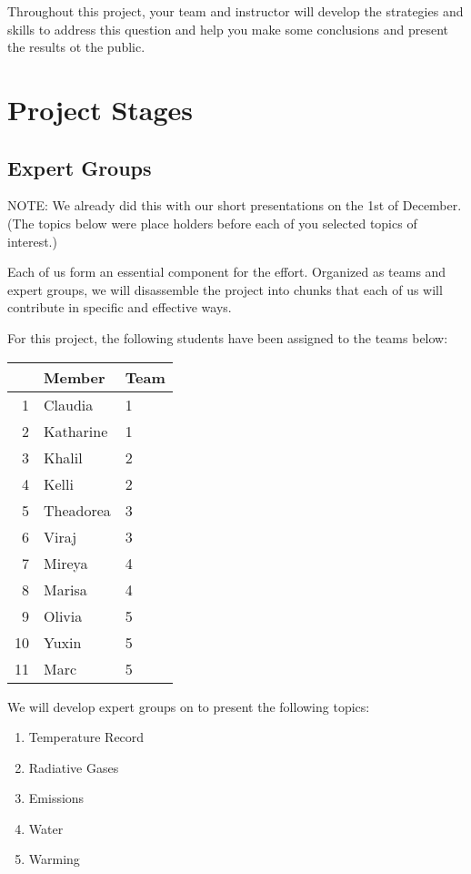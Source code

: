 \documentclass{article}\usepackage[]{graphicx}\usepackage[]{color}
\begin{document}
Throughout this project, your team and instructor will develop the strategies and skills to address this question and help you make some conclusions and present the results ot the public.

\section{Project Stages}

\subsection{Expert Groups}

NOTE: We already did this with our short presentations on the 1st of December. (The topics below were place holders before each of you selected topics of interest.)

Each of us form an essential component for the effort. Organized as teams and expert groups, we will disassemble the project into chunks that each of us will contribute in specific and effective ways.

For this project, the following students have been assigned to the teams below:

\begin{table}[ht]
\centering
\begin{tabular}{rll}
  \hline
 & Member & Team \\ 
  \hline
1 & Claudia & 1 \\ 
  2 & Katharine & 1 \\ 
  3 & Khalil & 2 \\ 
  4 & Kelli & 2 \\ 
  5 & Theadorea & 3 \\ 
  6 & Viraj & 3 \\ 
  7 & Mireya & 4 \\ 
  8 & Marisa & 4 \\ 
  9 & Olivia & 5 \\ 
  10 & Yuxin & 5 \\ 
  11 & Marc & 5 \\ 
   \hline
\end{tabular}
\end{table}


We will develop expert groups on to present the following topics:

\begin{enumerate}
  \item Temperature Record
  \item Radiative Gases
  \item Emissions 
  \item Water
  \item Warming 
\end{enumerate}
\end{document}
